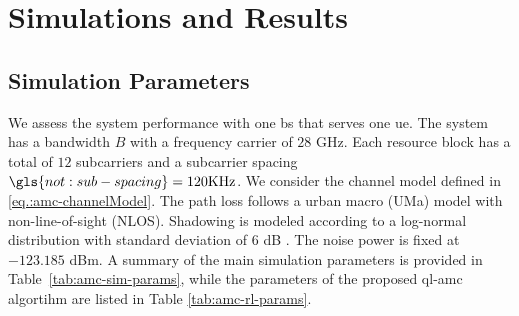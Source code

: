 %
%


\section{Simulations and Results}
\label{sec:amc-simulation}
\subsection{Simulation Parameters}
We assess the system performance with one \gls{bs} that serves one \gls{ue}.
%
The system has a bandwidth $B$ with a frequency carrier of $28$ GHz. Each resource block has a total of $12$ subcarriers and a subcarrier spacing $\gls{not:sub-spacing}= 120 \text{KHz}$.
%
We consider the channel model defined in \eqref{eq.:amc-channelModel}.
%
The path loss follows a urban macro (UMa) model with non-line-of-sight (NLOS). Shadowing is modeled according to a log-normal distribution with standard deviation of $6$ dB \cite{AliZaidi632018}.
%
The noise power is fixed at $-123.185$ dBm.
%
A summary of the main simulation parameters is provided in Table~\ref{tab:amc-sim-params}, while the parameters of the proposed \gls{ql-amc} algortihm are listed in Table \ref{tab:amc-rl-params}.


